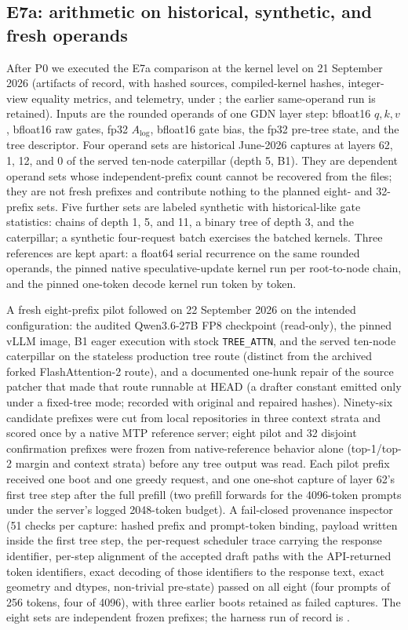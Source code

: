 \documentclass[conference]{IEEEtran}
\begin{document}
\subsection{E7a: arithmetic on historical, synthetic, and fresh operands}
\label{sec:e7a-pilot}
After P0 we executed the E7a comparison at the kernel level on 21 September 2026 (artifacts of record, with hashed sources, compiled-kernel hashes, integer-view equality metrics, and telemetry, under ; the earlier same-operand run  is retained). Inputs are the rounded operands of one GDN layer step: bfloat16 $q,k,v$, bfloat16 raw gates, fp32 $A_{\log}$, bfloat16 gate bias, the fp32 pre-tree state, and the tree descriptor. Four operand sets are historical June-2026 captures at layers 62, 1, 12, and 0 of the served ten-node caterpillar (depth 5, B1). They are dependent operand sets whose independent-prefix count cannot be recovered from the files; they are not fresh prefixes and contribute nothing to the planned eight- and 32-prefix sets. Five further sets are labeled synthetic with historical-like gate statistics: chains of depth 1, 5, and 11, a binary tree of depth 3, and the caterpillar; a synthetic four-request batch exercises the batched kernels. Three references are kept apart: a float64 serial recurrence on the same rounded operands, the pinned native speculative-update kernel run per root-to-node chain, and the pinned one-token decode kernel run token by token.

A fresh eight-prefix pilot followed on 22 September 2026 on the intended configuration: the audited Qwen3.6-27B FP8 checkpoint (read-only), the pinned vLLM image, B1 eager execution with stock \texttt{TREE\_ATTN}, and the served ten-node caterpillar on the stateless production tree route (distinct from the archived forked FlashAttention-2 route), and a documented one-hunk repair of the source patcher that made that route runnable at HEAD (a drafter constant emitted only under a fixed-tree mode; recorded with original and repaired hashes). Ninety-six candidate prefixes were cut from local repositories in three context strata and scored once by a native MTP reference server; eight pilot and 32 disjoint confirmation prefixes were frozen from native-reference behavior alone (top-1/top-2 margin and context strata) before any tree output was read. Each pilot prefix received one boot and one greedy request, and one one-shot capture of layer 62's first tree step after the full prefill (two prefill forwards for the 4096-token prompts under the server's logged 2048-token budget). A fail-closed provenance inspector (51 checks per capture: hashed prefix and prompt-token binding, payload written inside the first tree step, the per-request scheduler trace carrying the response identifier, per-step alignment of the accepted draft paths with the API-returned token identifiers, exact decoding of those identifiers to the response text, exact geometry and dtypes, non-trivial pre-state) passed on all eight (four prompts of 256 tokens, four of 4096), with three earlier boots retained as failed captures. The eight sets are independent frozen prefixes; the harness run of record is .
\end{document}
